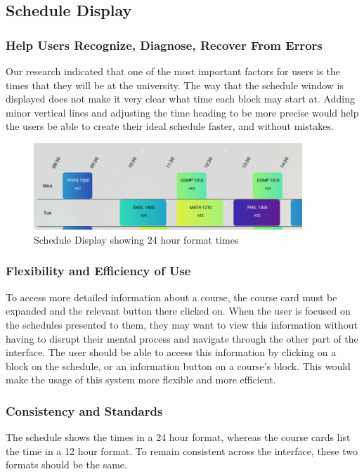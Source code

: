 \documentclass{article}
\begin{document}
\subsection{Schedule Display}

\subsubsection{Help Users Recognize, Diagnose, Recover From Errors}
Our research indicated that one of the most important factors for users is the times that they will be at the university. The way that the schedule window is displayed does not make it very clear what time each block may start at. Adding minor vertical lines and adjusting the time heading to be more precise would help the users be able to create their ideal schedule faster, and without mistakes.


\begin{figure}[h!]
    \centering
    \includegraphics[width = 0.9\textwidth]{sched2.png}
    \caption{Schedule Display showing 24 hour format times}
    \label{fig:sched}
\end{figure}



\subsubsection{Flexibility and Efficiency of Use}
To access more detailed information about a course, the course card must be expanded and the relevant button there clicked on. When the user is focused on the schedules presented to them, they may want to view this information without having to disrupt their mental process and navigate through the other part of the interface. The user should be able to access this information by clicking on a block on the schedule, or an information button on a course's block. This would make the usage of this system more flexible and more efficient.



\subsubsection{Consistency and Standards}
The schedule shows the times in a 24 hour format, whereas the course cards list the time in a 12 hour format. To remain consistent across the interface, these two formats should be the same.
\end{document}
